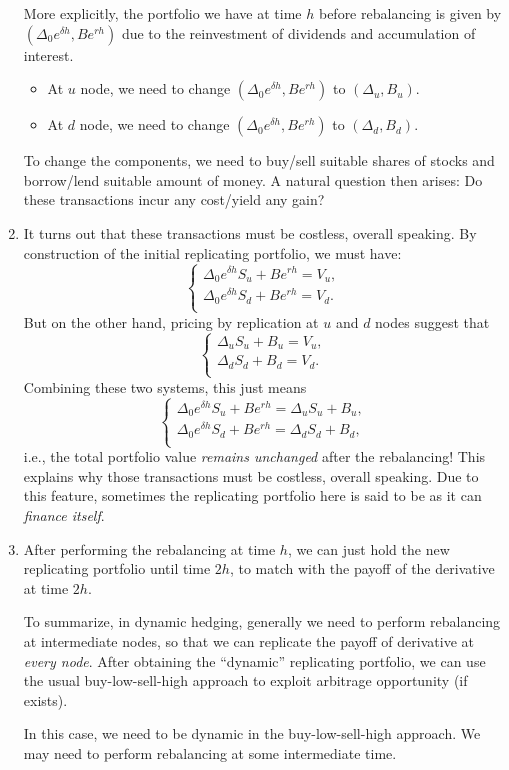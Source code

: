 \begin{enumerate}
More explicitly, the portfolio we have at time \(h\) before rebalancing is
given by \((\Delta_0e^{\delta h},Be^{rh})\) due to the reinvestment of
dividends and accumulation of interest.
\begin{itemize}
\item At \(u\) node, we need to change \((\Delta_0e^{\delta h},Be^{rh})\) to \((\Delta_u,B_u)\).
\item At \(d\) node, we need to change \((\Delta_0e^{\delta h},Be^{rh})\) to \((\Delta_d,B_d)\).
\end{itemize}
To change the components, we need to buy/sell suitable shares of stocks and
borrow/lend suitable amount of money. A natural question then arises: Do these
transactions incur any cost/yield any gain?

\item It turns out that these transactions must be costless, overall speaking. By construction of
the initial replicating portfolio, we must have:
\[
\begin{cases}
\Delta_0e^{\delta h}S_u+Be^{rh}=V_u,\\
\Delta_0e^{\delta h}S_d+Be^{rh}=V_d.\\
\end{cases}
\]
But on the other hand, pricing by replication at \(u\)
and \(d\) nodes suggest that
\[
\begin{cases}
\Delta_u S_u+B_u=V_u,\\
\Delta_d S_d+B_d=V_d.\\
\end{cases}
\]
Combining these two systems, this just means
\[
\begin{cases}
\Delta_0e^{\delta h}S_u+Be^{rh}=\Delta_u S_u+B_u,\\
\Delta_0e^{\delta h}S_d+Be^{rh}=\Delta_d S_d+B_d,\\
\end{cases}
\]
i.e., the total portfolio value \emph{remains unchanged} after the rebalancing!
This explains why those transactions must be costless, overall speaking.
Due to this feature, sometimes the replicating portfolio here is said to be
 as it can \emph{finance itself}.

\item After performing the rebalancing at time \(h\), we can just hold the new
replicating portfolio until time \(2h\), to match with the payoff of the
derivative at time \(2h\).

To summarize, in dynamic hedging, generally we need to perform rebalancing at
intermediate nodes, so that we can replicate the payoff of derivative at
\emph{every node}. After obtaining the ``dynamic'' replicating portfolio, we
can use the usual buy-low-sell-high approach to exploit arbitrage opportunity
(if exists). \begin{note}
In this case, we need to be dynamic in the buy-low-sell-high approach. We may
need to perform rebalancing at some intermediate time.
\end{note}
\end{enumerate}

